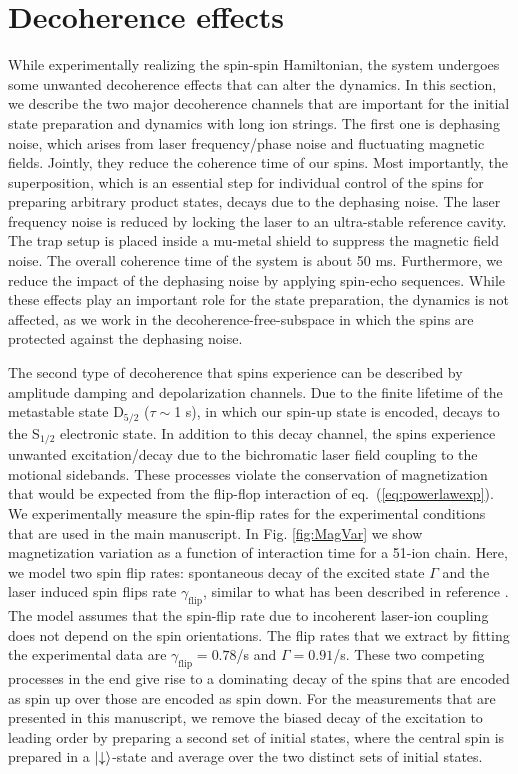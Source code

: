 \documentclass[aps,10pt,reprint,groupedaddress,superscriptaddress]{revtex4-2}
\begin{document}
\section{Decoherence effects}

While experimentally realizing the spin-spin Hamiltonian, the system undergoes some unwanted decoherence effects that can alter the dynamics. In this section, we describe the two major decoherence channels that are important for the initial state preparation and dynamics with long ion strings. The first one is dephasing noise, which arises from laser frequency/phase noise and fluctuating magnetic fields. Jointly, they reduce the coherence time of our spins. Most importantly, the superposition, which is an essential step for individual control of the spins for preparing arbitrary product states, decays due to the dephasing noise. The laser frequency noise is reduced by locking the laser to an ultra-stable reference cavity. The trap setup is placed inside a mu-metal shield to suppress the magnetic field noise. The overall coherence time of the system is about 50 ms. Furthermore, we reduce the impact of the dephasing noise by applying spin-echo sequences. While these effects play an important role for the state preparation, the dynamics is not affected, as we work in the decoherence-free-subspace in which the spins are protected against the dephasing noise.

The second type of decoherence that spins experience can be described by amplitude damping and depolarization channels. Due to the finite lifetime of the metastable state D${}_{5/2}$ ($\tau \sim $1 s), in which our spin-up state is encoded, decays to the S${}_{1/2}$ electronic state. In addition to this decay channel, the spins experience unwanted excitation/decay due to the bichromatic laser field coupling to the motional sidebands. These processes violate the conservation of magnetization that would be expected from the flip-flop interaction of eq.~(\ref{eq:powerlawexp}). We experimentally measure the spin-flip rates for the experimental conditions that are used in the main manuscript. In Fig. \ref{fig:MagVar} we show magnetization variation as a function of interaction time for a 51-ion chain. Here, we model two spin flip rates: spontaneous decay of the excited state $\Gamma$ and the laser induced spin flips rate $\gamma_\text{flip}$, similar to what has been described in reference \cite{Brydges_2019}. The model assumes that the spin-flip rate due to incoherent laser-ion coupling does not depend on the spin orientations. The flip rates that we extract by fitting the experimental data are $\gamma_\text{flip} =0.78$/s and $\Gamma=0.91$/s. These two competing processes in the end give rise to a dominating decay of the spins that are encoded as spin up over those are encoded as spin down. For the measurements that are presented in this manuscript, we remove the biased decay of the excitation to leading order by preparing a second set of initial states, where the central spin is prepared in a $\ket{\downarrow}$-state and average over the two distinct sets of initial states.  
\end{document}
